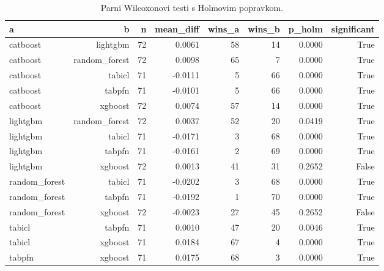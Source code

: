 \begin{table}[htbp]
\centering
\caption{Parni Wilcoxonovi testi s Holmovim popravkom.}
\label{tab:wilcoxon}
\begin{tabular}{lrrrrrrr}
\hline
a & b & n & mean\_diff & wins\_a & wins\_b & p\_holm & significant \\
\hline
catboost & lightgbm & 72 & 0.0061 & 58 & 14 & 0.0000 & True \\
catboost & random\_forest & 72 & 0.0098 & 65 & 7 & 0.0000 & True \\
catboost & tabicl & 71 & -0.0111 & 5 & 66 & 0.0000 & True \\
catboost & tabpfn & 71 & -0.0101 & 5 & 66 & 0.0000 & True \\
catboost & xgboost & 72 & 0.0074 & 57 & 14 & 0.0000 & True \\
lightgbm & random\_forest & 72 & 0.0037 & 52 & 20 & 0.0419 & True \\
lightgbm & tabicl & 71 & -0.0171 & 3 & 68 & 0.0000 & True \\
lightgbm & tabpfn & 71 & -0.0161 & 2 & 69 & 0.0000 & True \\
lightgbm & xgboost & 72 & 0.0013 & 41 & 31 & 0.2652 & False \\
random\_forest & tabicl & 71 & -0.0202 & 3 & 68 & 0.0000 & True \\
random\_forest & tabpfn & 71 & -0.0192 & 1 & 70 & 0.0000 & True \\
random\_forest & xgboost & 72 & -0.0023 & 27 & 45 & 0.2652 & False \\
tabicl & tabpfn & 71 & 0.0010 & 47 & 20 & 0.0046 & True \\
tabicl & xgboost & 71 & 0.0184 & 67 & 4 & 0.0000 & True \\
tabpfn & xgboost & 71 & 0.0175 & 68 & 3 & 0.0000 & True \\
\hline
\end{tabular}
\end{table}
